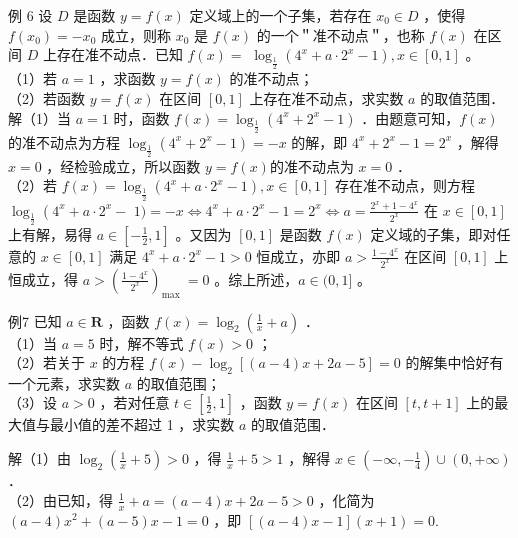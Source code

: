 \documentclass[10pt]{article}
\begin{document}
例 6 设 \(D\) 是函数 \(y=f(x)\) 定义域上的一个子集，若存在 \(x_{0} \in D\) ，使得 \(f\left(x_{0}\right)=-x_{0}\) 成立，则称 \(x_{0}\) 是 \(f(x)\) 的一个＂准不动点＂，也称 \(f(x)\) 在区间 \(D\) 上存在准不动点．已知 \(f(x)=\) \(\log _{\frac{1}{2}}\left(4^{x}+a \cdot 2^{x}-1\right), x \in[0,1]\) 。\\
（1）若 \(a=1\) ，求函数 \(y=f(x)\) 的准不动点；\\
（2）若函数 \(y=f(x)\) 在区间 \([0,1]\) 上存在准不动点，求实数 \(a\) 的取值范围．\\
解（1）当 \(a=1\) 时，函数 \(f(x)=\log _{\frac{1}{2}}\left(4^{x}+2^{x}-1\right)\) ．由题意可知，\(f(x)\) 的准不动点为方程 \(\log _{\frac{1}{2}}\left(4^{x}+2^{x}-1\right)=-x\) 的解，即 \(4^{x}+2^{x}-1=2^{x}\) ，解得 \(x=0\) ，经检验成立，所以函数 \(y=f(x)\)的准不动点为 \(x=0\) ．\\
（2）若 \(f(x)=\log _{\frac{1}{2}}\left(4^{x}+a \cdot 2^{x}-1\right), x \in[0,1]\) 存在准不动点，则方程 \(\log _{\frac{1}{2}}\left(4^{x}+a \cdot 2^{x}-\right.\) \(1)=-x \Leftrightarrow 4^{x}+a \cdot 2^{x}-1=2^{x} \Leftrightarrow a=\frac{2^{x}+1-4^{x}}{2^{x}}\) 在 \(x \in[0,1]\) 上有解，易得 \(a \in\left[-\frac{1}{2}, 1\right]\) 。又因为 \([0,1]\) 是函数 \(f(x)\) 定义域的子集，即对任意的 \(x \in[0,1]\) 满足 \(4^{x}+a \cdot 2^{x}-1>0\) 恒成立，亦即 \(a>\frac{1-4^{x}}{2^{x}}\) 在区间 \([0,1]\) 上恒成立，得 \(a>\left(\frac{1-4^{x}}{2^{x}}\right)_{\text {max }}=0\) 。综上所述，\(a \in(0,1]\) 。

例7 已知 \(a \in \mathbf{R}\) ，函数 \(f(x)=\log _{2}\left(\frac{1}{x}+a\right)\) ．\\
（1）当 \(a=5\) 时，解不等式 \(f(x)>0\) ；\\
（2）若关于 \(x\) 的方程 \(f(x)-\log _{2}[(a-4) x+2 a-5]=0\) 的解集中恰好有一个元素，求实数 \(a\) 的取值范围；\\
（3）设 \(a>0\) ，若对任意 \(t \in\left[\frac{1}{2}, 1\right]\) ，函数 \(y=f(x)\) 在区间 \([t, t+1]\) 上的最大值与最小值的差不超过 1 ，求实数 \(a\) 的取值范围．

解（1）由 \(\log _{2}\left(\frac{1}{x}+5\right)>0\) ，得 \(\frac{1}{x}+5>1\) ，解得 \(x \in\left(-\infty,-\frac{1}{4}\right) \cup(0,+\infty)\) ．\\
（2）由已知，得 \(\frac{1}{x}+a=(a-4) x+2 a-5>0\) ，化简为 \((a-4) x^{2}+(a-5) x-1=0\) ，即 \([(a-4) x-1](x+1)=0\).
\end{document}
